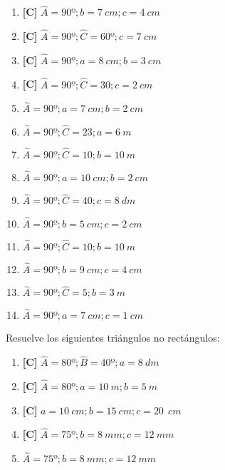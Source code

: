 \begin{enumerate}[topsep=0pt]
	\item \textbf{[C]} $\widehat{A} = 90º; b = 7~cm; c = 4~cm  $
	\item \textbf{[C]} $\widehat{A} = 90º; \widehat{C} = 60º; c = 7~cm  $
	\item \textbf{[C]} $\widehat{A} = 90º; a = 8~cm; b = 3~cm  $
	\item \textbf{[C]} $\widehat{A} = 90º; \widehat{C} = 30; c = 2~cm  $
	
	\item $\widehat{A} = 90º; a = 7~cm; b = 2~cm  $
	\item $\widehat{A} = 90º; \widehat{C} = 23; a = 6~m  $
	\item $\widehat{A} = 90º; \widehat{C} = 10; b = 10~m  $
	\item $\widehat{A} = 90º; a = 10~cm; b = 2~cm  $
	\item $\widehat{A} = 90º; \widehat{C} = 40; c = 8~dm  $
	\item $\widehat{A} = 90º; b = 5~cm; c = 2~cm  $
	\item $\widehat{A} = 90º; \widehat{C} = 10; b = 10~m  $
	\item $\widehat{A} = 90º; b = 9~cm; c = 4~cm  $
	\item $\widehat{A} = 90º; \widehat{C} = 5; b = 3~m  $
	\item $\widehat{A} = 90º; a = 7~cm; c = 1~cm  $

\end{enumerate}


\Exercicio Resuelve los siguientes triángulos no rectángulos:

\begin{enumerate}[topsep=0pt]
	\item \textbf{[C]} $\widehat{A} = 80º; \widehat{B} = 40º; a = 8~dm  $
	\item \textbf{[C]} $\widehat{A} = 80º;  a = 10~m; b = 5~m  $
	\item \textbf{[C]} $a = 10~cm; b = 15~cm; c = 20~~cm  $
	\item \textbf{[C]} $\widehat{A} = 75º; b = 8~mm; c = 12~mm  $

	\item $\widehat{A} = 75º; b = 8~mm; c = 12~mm  $
\end{enumerate}